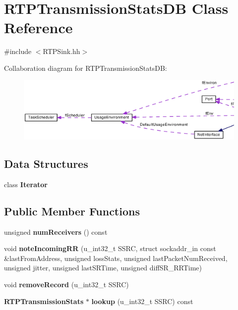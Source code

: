 \section{R\+T\+P\+Transmission\+Stats\+D\+B Class Reference}
\label{classRTPTransmissionStatsDB}


{\ttfamily \#include $<$R\+T\+P\+Sink.\+hh$>$}



Collaboration diagram for R\+T\+P\+Transmission\+Stats\+D\+B\+:
\nopagebreak
\begin{figure}[H]
\begin{center}
\leavevmode
\includegraphics[width=350pt]{classRTPTransmissionStatsDB__coll__graph}
\end{center}
\end{figure}
\subsection*{Data Structures}
\begin{DoxyCompactItemize}
\item 
class {\bf Iterator}
\end{DoxyCompactItemize}
\subsection*{Public Member Functions}
\begin{DoxyCompactItemize}
\item 
unsigned {\bf num\+Receivers} () const 
\item 
void {\bf note\+Incoming\+R\+R} (u\+\_\+int32\+\_\+t S\+S\+R\+C, struct sockaddr\+\_\+in const \&last\+From\+Address, unsigned loss\+Stats, unsigned last\+Packet\+Num\+Received, unsigned jitter, unsigned last\+S\+R\+Time, unsigned diff\+S\+R\+\_\+\+R\+R\+Time)
\item 
void {\bf remove\+Record} (u\+\_\+int32\+\_\+t S\+S\+R\+C)
\item 
{\bf R\+T\+P\+Transmission\+Stats} $\ast$ {\bf lookup} (u\+\_\+int32\+\_\+t S\+S\+R\+C) const 
\end{DoxyCompactItemize}
